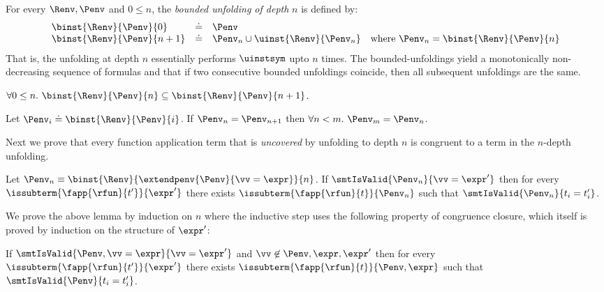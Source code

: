 %
For every $\Renv, \Penv$ and $0 \leq n$,
the \emph{bounded unfolding of depth} $n$ is
defined by:
%
$$\begin{array}{lcl}
  \binst{\Renv}{\Penv}{0}     & \doteq & \Penv \\
  \binst{\Renv}{\Penv}{n+1}   & \doteq & \Penv_n \cup \uinst{\Renv}{\Penv_n}
  \quad \mbox{where}\ \Penv_n = \binst{\Renv}{\Penv}{n}
\end{array}$$
%
That is, the unfolding at depth $n$ essentially
performs $\uinstsym$ upto $n$ times.
%
The bounded-unfoldings yield a monotonically
non-decreasing sequence of formulas and that
if two consecutive bounded unfoldings coincide,
then all subsequent unfoldings are the same.
%

\begin{lemma} \label{lem:bounded:mono}
$\forall 0 \leq n.\ \binst{\Renv}{\Penv}{n} \subseteq \binst{\Renv}{\Penv}{n + 1}$.
\end{lemma}

\begin{lemma} \label{lem:bounded:fix}
Let $\Penv_i \doteq \binst{\Renv}{\Penv}{i}$.
If $\Penv_n = \Penv_{n+1}$
then $\forall n < m.\ \Penv_m = \Penv_n$.
\end{lemma}

%
Next we prove that every function application
term that is \emph{uncovered} by unfolding to
depth $n$ is congruent to a term in the $n$-depth
unfolding.

\begin{lemma} \label{lem:uncovering}
Let $\Penv_n \equiv \binst{\Renv}{\extendpenv{\Penv}{\vv = \expr}}{n}$.
If   $\smtIsValid{\Penv_n}{\vv = \expr'}$
then for every $\issubterm{\fapp{\rfun}{t'}}{\expr'}$
       there exists $\issubterm{\fapp{\rfun}{t}}{\Penv_n}$
         such that $\smtIsValid{\Penv_n}{t_i = t'_i}$.
\end{lemma}

We prove the above lemma by induction on $n$
where the inductive step uses the following
property of congruence closure, which itself
is proved by induction on the structure of
$\expr'$:

\begin{lemma} \label{lem:congruence}
If   $\smtIsValid{\Penv, \vv = \expr}{\vv = \expr'}$
     and
     $\vv \not \in \Penv, \expr, \expr'$
then for every $\issubterm{\fapp{\rfun}{t'}}{\expr'}$
       there exists $\issubterm{\fapp{\rfun}{t}}{\Penv, \expr}$
         such that $\smtIsValid{\Penv}{t_i = t'_i}$.
\end{lemma}


